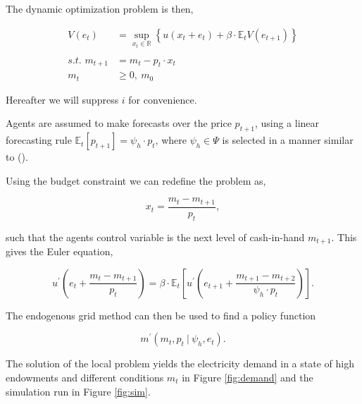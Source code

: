 \documentclass[american]{scrartcl}
\newcommand{\E}{\mathbb{E}}
\newcommand{\R}{\mathbb{R}}
\begin{document}
The dynamic optimization problem is then,

\begin{equation*}
    \begin{split}
        V(e_t) &= \sup_{x_t \in \R} \left\{u(x_t + e_t) + \beta \cdot \E_t V( e_{t+1} ) \right\} \\
        \\
        \textit{s.t. } m_{t+1} &= m_{t} - p_{t} \cdot x_{t}\\
        m_t  &\geq 0, \ m_0
    \end{split}
\end{equation*}

Hereafter we will suppress $i$ for convenience.

Agents are assumed to make forecasts over the price $p_{t+1}$, using a linear forecasting rule $\E_t[p_{t+1}] = \psi_h\cdot p_t$, where $\psi_h \in \Psi$ is selected in a manner similar to \citeauthor{Hommes2013} (\citeyear{Hommes2013}).

Using the budget constraint we can redefine the problem as,

\begin{equation}
    x_t = \frac{m_t - m_{t+1}}{p_t},
\end{equation}

such that the agents control variable is the next level of cash-in-hand $m_{t+1}$. This gives the Euler equation,

\begin{equation}
    u^\prime\left( e_t + \frac{m_t - m_{t+1}}{p_t} \right) = \beta \cdot \E_t \left[ u^\prime\left(e_{t+1} + \frac{m_{t+1} - m_{t+2}}{ \psi_h \cdot p_t} \right)  \right].
\end{equation}

The endogenous grid method can then be used to find a policy function

\begin{equation}
    m^\prime(m_t, p_t \ \vert \ \psi_h, e_t).
\end{equation}

The solution of the local problem yields the electricity demand in a state of high endowments and different conditions $m_t$ in Figure \ref{fig:demand} and the simulation run in Figure \ref{fig:sim}.
\end{document}
